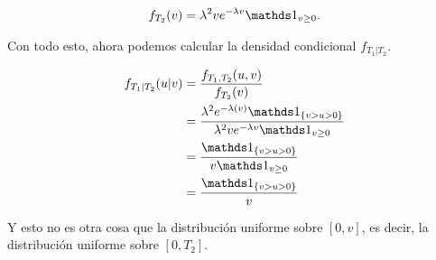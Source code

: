 \begin{align}
    f_{T_2}(v) = \lambda^2 v e^{-\lambda v} \indic_{v \geq 0}.
\end{align}

Con todo esto, ahora podemos calcular la densidad condicional $f_{T_1 | T_2}$.

\begin{align}
    f_{T_1 | T_2}(u | v)    &=     \frac{f_{T_1 , T_2}(u, v)}{ f_{T_2}(v)}                                                                      \\
                            &=     \frac{\lambda^2 e^{-\lambda (v)} \indic_{\{ v > u > 0 \}}}{ \lambda^2 v e^{-\lambda v} \indic_{v \geq 0}}    \\
                            &=     \frac{ \indic_{\{ v > u > 0 \}}}{ v  \indic_{v \geq 0}}                                                      \\
                            &=     \frac{ \indic_{\{ v > u > 0 \}}}{v}                                                      
\end{align}

Y esto no es otra cosa que la distribución uniforme sobre $[0, v]$, es decir, la distribución uniforme sobre $[0, T_2]$.